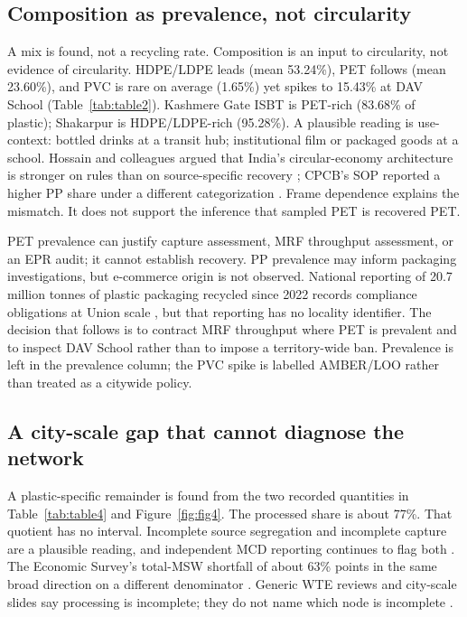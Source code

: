 \documentclass[12pt,a4paper]{article}
\begin{document}
\subsection{Composition as prevalence, not circularity}

A mix is found, not a recycling rate. Composition is an input to circularity, not evidence of circularity. HDPE/LDPE leads (mean 53.24\%), PET follows (mean 23.60\%), and PVC is rare on average (1.65\%) yet spikes to 15.43\% at DAV School (Table~\ref{tab:table2}). Kashmere Gate ISBT is PET-rich (83.68\% of plastic); Shakarpur is HDPE/LDPE-rich (95.28\%). A plausible reading is use-context: bottled drinks at a transit hub; institutional film or packaged goods at a school. Hossain and colleagues argued that India's circular-economy architecture is stronger on rules than on source-specific recovery \citep{haque_plastic_waste_india_2022}; CPCB's SOP reported a higher PP share under a different categorization \citep{cpcb_sop_pwm_2024}. Frame dependence explains the mismatch. It does not support the inference that sampled PET is recovered PET.

PET prevalence can justify capture assessment, MRF throughput assessment, or an EPR audit; it cannot establish recovery. PP prevalence may inform packaging investigations, but e-commerce origin is not observed. National reporting of 20.7 million tonnes of plastic packaging recycled since 2022 records compliance obligations at Union scale \citep{dte_epr_recycled_2026,cpcb_pwm_amendment_2026,pib_plastic_waste_2025}, but that reporting has no locality identifier. The decision that follows is to contract MRF throughput where PET is prevalent and to inspect DAV School rather than to impose a territory-wide ban. Prevalence is left in the prevalence column; the PVC spike is labelled AMBER/LOO rather than treated as a citywide policy.

\subsection{A city-scale gap that cannot diagnose the network}

A plastic-specific remainder is found from the two recorded quantities in Table~\ref{tab:table4} and Figure~\ref{fig:fig4}. The processed share is about 77\%. That quotient has no interval. Incomplete source segregation and incomplete capture are a plausible reading, and independent MCD reporting continues to flag both \citep{nie_segregation_failed_2026,toi_segregation_roadmap_2026}. The Economic Survey's total-MSW shortfall of about 63\% points in the same broad direction on a different denominator \citep{delhi_eco_survey_2026,nie_mcd_four_plants_2025}. Generic WTE reviews and city-scale slides say processing is incomplete; they do not name which node is incomplete \citep{sciencedirect_wte_india_review_2014,mcd_swm_ppt}.
\end{document}
